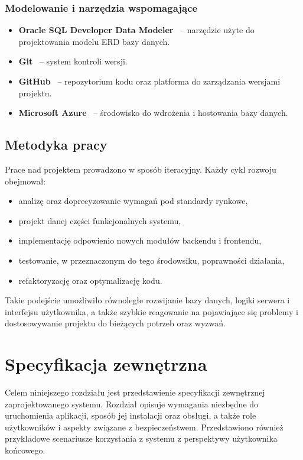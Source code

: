 \documentclass[a4paper,twoside,12pt]{book}
\begin{document}
\subsection{Modelowanie i narzędzia wspomagające}

\begin{itemize}
    \item \textbf{Oracle SQL Developer Data Modeler}~\cite{oracle_datamodeler} – narzędzie użyte do projektowania modelu ERD bazy danych.
    \item \textbf{Git}~\cite{git} – system kontroli wersji.
    \item \textbf{GitHub}~\cite{github} – repozytorium kodu oraz platforma do zarządzania wersjami projektu.
    \item \textbf{Microsoft Azure}~\cite{azure} – środowisko do wdrożenia i hostowania bazy danych.
\end{itemize}

\section{Metodyka pracy}

Prace nad projektem prowadzono w sposób iteracyjny. Każdy cykl rozwoju obejmował:

\begin{itemize}
    \item analizę oraz doprecyzowanie wymagań pod standardy rynkowe,
    \item projekt danej części funkcjonalnych systemu,
    \item implementację odpowienio nowych modułów backendu i frontendu,
    \item testowanie, w przeznaczonym do tego środowsiku, poprawności działania,
    \item refaktoryzację oraz optymalizację kodu.
\end{itemize}

Takie podejście umożliwiło równoległe rozwijanie bazy danych, logiki serwera i interfejsu użytkownika, a także szybkie reagowanie na pojawiające się problemy i dostosowywanie projektu do bieżących potrzeb oraz wyzwań.

\chapter{Specyfikacja zewnętrzna}
\label{ch:04}
Celem niniejszego rozdziału jest przedstawienie specyfikacji zewnętrznej
zaprojektowanego systemu. Rozdział opisuje wymagania niezbędne do uruchomienia
aplikacji, sposób jej instalacji oraz obsługi, a także role użytkowników i
aspekty związane z bezpieczeństwem. Przedstawiono również przykładowe scenariusze
korzystania z systemu z perspektywy użytkownika końcowego.
\end{document}
